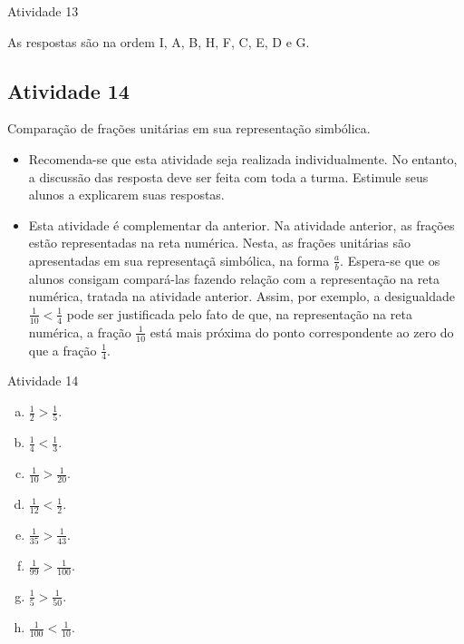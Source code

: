 \begin{multicols}{2}
\begin{itemize}
  \end{itemize}
  

\begin{resposta*}{Atividade 13}

As respostas são na ordem I, A, B, H, F, C, E, D e G. 

\end{resposta*}

\subsection{Atividade 14}

  Comparação de frações unitárias em sua representação simbólica.

\begin{itemize}
 \item  Recomenda-se que esta atividade seja realizada individualmente. No entanto, a discussão das resposta deve ser feita com toda a turma. Estimule seus alunos a explicarem suas respostas.
 \item  Esta atividade é complementar da anterior. Na atividade anterior, as frações estão representadas na reta numérica. Nesta, as frações unitárias são apresentadas em sua representaçã simbólica, na forma $\frac{a}{b}$. Espera-se que os alunos consigam compará-las fazendo relação com a representação na reta numérica, tratada na atividade anterior. Assim, por exemplo, a desigualdade $\frac{1}{10} < \frac{1}{4}$ pode ser justificada pelo fato de que, na representação na reta numérica, a fração $\frac{1}{10}$ está mais próxima do ponto correspondente ao zero do que a fração $\frac{1}{4}$. 
\end{itemize}

\begin{resposta*}{Atividade 14}
\begin{enumerate}[a)]
 \item $\frac{1}{2}>\frac{1}{5}$.
\item $\frac{1}{4}<\frac{1}{3}$.  
\item $\frac{1}{10}>\frac{1}{20}$. 
\item $\frac{1}{12}<\frac{1}{2}$.
\item $\frac{1}{35}>\frac{1}{43}$.
\item  $\frac{1}{99}>\frac{1}{100}$.
\item  $\frac{1}{5}>\frac{1}{50}$.
\item  $\frac{1}{100}<\frac{1}{10}$.
\end{enumerate}
 

\end{resposta*}
\end{multicols}
